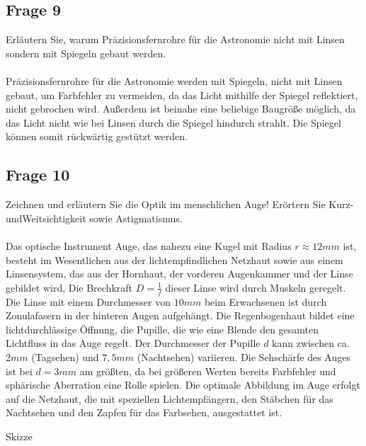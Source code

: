 \documentclass[a4paper,10pt]{scrartcl}
\begin{document}
	\subsection{Frage 9}
		Erläutern Sie, warum Präzisionsfernrohre für die Astronomie nicht mit Linsen sondern mit Spiegeln gebaut werden.
		\\
		\\
		Präzisionsfernrohre für die Astronomie werden mit Spiegeln, nicht mit Linsen gebaut, um Farbfehler zu vermeiden, da das Licht mithilfe der Spiegel reflektiert, nicht gebrochen wird. Außerdem ist beinahe eine beliebige Baugröße möglich, da das Licht nicht wie bei Linsen durch die Spiegel hindurch strahlt. Die Spiegel können somit rückwärtig gestützt werden.
	\subsection{Frage 10}
		Zeichnen und erläutern Sie die Optik im menschlichen Auge! Erörtern Sie Kurz- undWeitsichtigkeit sowie Astigmatismus.
		\\
		\\
		Das optische Instrument Auge, das nahezu eine Kugel mit Radius $r\approx12 mm$ ist, besteht im Wesentlichen aus der lichtempfindlichen Netzhaut sowie aus einem Linsensystem, das aus der Hornhaut, der vorderen Augenkammer und der Linse gebildet wird, Die Brechkraft $D=\frac{1}{f}$ dieser Linse wird durch Muskeln geregelt. Die Linse mit einem Durchmesser von $10 mm$ beim Erwachsenen ist durch Zonulafasern in der hinteren Augen aufgehängt. Die Regenbogenhaut bildet eine lichtdurchlässige Öffnung, die Pupille, die wie eine Blende den gesamten Lichtfluss in das Auge regelt. Der Durchmesser der Pupille $d$ kann zwischen ca. $2 mm$ (Tagsehen) und $7,5 mm$ (Nachtsehen) variieren. Die Sehschärfe des Auges ist bei $d=3 mm$ am größten, da bei größeren Werten bereits Farbfehler und sphärische Aberration eine Rolle spielen. Die optimale Abbildung im Auge erfolgt auf die Netzhaut, die mit speziellen Lichtempfängern, den Stäbchen für das Nachtsehen und den Zapfen für das Farbsehen, ausgestattet ist.
		
			\begin{center}
			Skizze
			\end{center}
	
\end{document}

